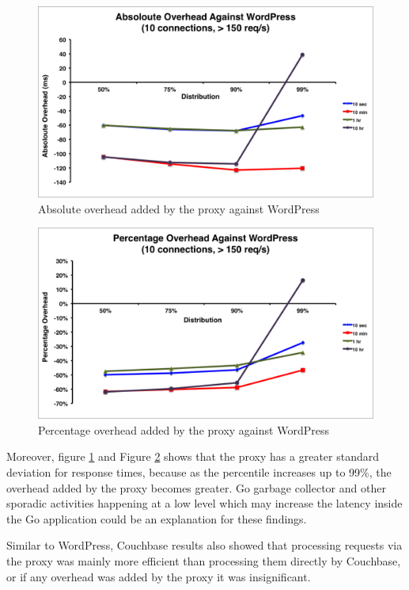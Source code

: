 \documentclass[a4paper,11pt,twoside]{report}
\begin{document}
\begin{figure}[!ht]
  \centering
     \includegraphics[scale=0.55]{absoloute-wordpress}
  \caption{Absolute overhead added by the proxy against WordPress}
  \label{absoloute-wordpress}
\end{figure} 

\begin{figure}[!ht]
  \centering
     \includegraphics[scale=0.55]{percentage-wordpress}
  \caption{Percentage overhead added by the proxy against WordPress}
  \label{percentage-wordpress}
\end{figure} 

Moreover, figure \ref{absoloute-wordpress} and Figure \ref{percentage-wordpress} shows that the proxy has a greater standard deviation for response times, because as the percentile increases up to 99\%, the overhead added by the proxy becomes greater. Go garbage collector and other sporadic activities happening at a low level which may increase the latency inside the Go application could be an explanation for these findings.

Similar to WordPress, Couchbase results also showed that processing requests via the proxy was mainly more efficient than processing them directly by Couchbase, or if any overhead was added by the proxy it was insignificant.
\end{document}
